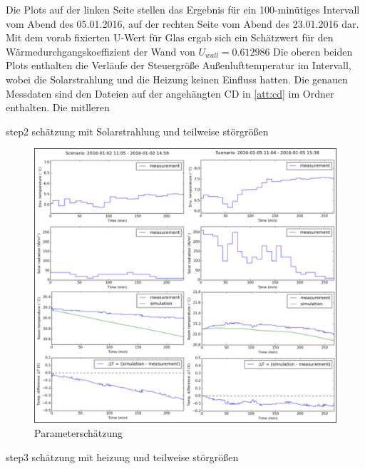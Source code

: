 Die Plots auf der linken Seite stellen das Ergebnis für ein 100-minütiges Intervall vom Abend des 05.01.2016, auf der rechten Seite vom Abend des 23.01.2016 dar. Mit dem vorab fixierten U-Wert für Glas ergab sich ein Schätzwert für den Wärmedurchgangskoeffizient der Wand von $U_{wall}=0.612986$ 
Die oberen beiden Plots enthalten die Verläufe der Steuergröße Außenlufttemperatur im Intervall, wobei die Solarstrahlung und die Heizung keinen Einfluss hatten. Die genauen Messdaten sind den Dateien auf der angehängten CD in \ref{att:cd} im Ordner enthalten. Die mitlleren


step2 schätzung mit Solarstrahlung und teilweise störgrößen
\begin{figure}
\centering
\includegraphics[width=\textwidth]{abbildungen/20160329_pestep2}
\caption{Parameterschätzung}
\label{fig:step2}
\end{figure}

step3 schätzung mit heizung und teilweise störgrößen

